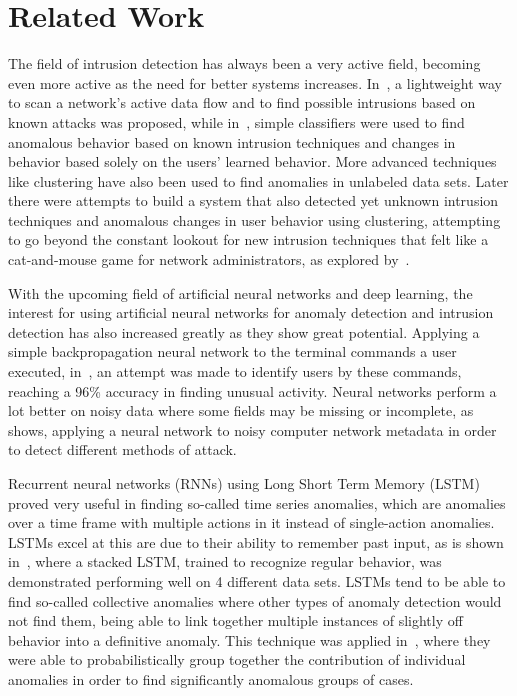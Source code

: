 \chapter{Related Work}\label{ch:related_work}

The field of intrusion detection has always been a very active field, becoming even more active as the need for better systems increases. In~\cite{roesch1999snort}, a lightweight way to scan a network's active data flow and to find possible intrusions based on known attacks was proposed, while in~\cite{lee1998data}, simple classifiers were used to find anomalous behavior based on known intrusion techniques and changes in behavior based solely on the users' learned behavior. More advanced techniques like clustering have also been used to find anomalies in unlabeled data sets. Later  there were attempts to build a system that also detected yet unknown intrusion techniques and anomalous changes in user behavior using clustering, attempting to go beyond the constant lookout for new intrusion techniques that felt like a cat-and-mouse game for network administrators, as explored by~\cite{Portnoy01intrusiondetection}.

With the upcoming field of artificial neural networks and deep learning, the interest for using artificial neural networks for anomaly detection and intrusion detection has also increased greatly as they show great potential. Applying a simple backpropagation neural network to the terminal commands a user executed, in~\cite{ryan1998intrusion}, an attempt was made to identify users by these commands, reaching a 96\% accuracy in finding unusual activity. Neural networks perform a lot better on noisy data where some fields may be missing or incomplete, as~\cite{cannady1998artificial} shows, applying a neural network to noisy computer network metadata in order to detect different methods of attack.

Recurrent neural networks (RNNs) using Long Short Term Memory (LSTM) proved very useful in finding so-called time series anomalies, which are anomalies over a time frame with multiple actions in it instead of single-action anomalies. LSTMs excel at this are due to their ability to remember past input, as is shown in~\cite{malhotra2015long}, where a stacked LSTM, trained to recognize regular behavior, was demonstrated performing well on 4 different data sets. LSTMs tend to be able to find so-called collective anomalies where other types of anomaly detection would not find them, being able to link together multiple instances of slightly off behavior into a definitive anomaly. This technique was applied in~\cite{olsson2015probabilistic}, where they were able to probabilistically group together the contribution of individual anomalies in order to find significantly anomalous groups of cases.
